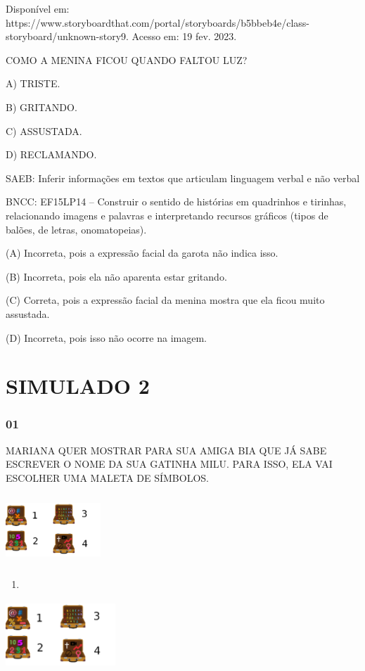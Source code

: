 Disponível em:
https://www.storyboardthat.com/portal/storyboards/b5bbeb4e/class-storyboard/unknown-story9. Acesso em: 19 fev. 2023.

COMO A MENINA FICOU QUANDO FALTOU LUZ?

A) TRISTE.

B) GRITANDO.

C) ASSUSTADA.

D) RECLAMANDO.

SAEB: Inferir informações em textos que articulam linguagem
verbal e não verbal

BNCC: EF15LP14 -- Construir o sentido de histórias em
quadrinhos e tirinhas, relacionando imagens e palavras e interpretando
recursos gráficos (tipos de balões, de letras, onomatopeias).

(A) Incorreta, pois a expressão facial da garota não indica isso.

(B) Incorreta, pois ela não aparenta estar gritando.

(C) Correta, pois a expressão facial da menina mostra que ela ficou
muito assustada.

(D) Incorreta, pois isso não ocorre na imagem.

\section{SIMULADO 2}\label{simulado-2}

\subsubsection{01}\label{section-41}

MARIANA QUER MOSTRAR PARA SUA AMIGA BIA QUE JÁ SABE ESCREVER O NOME DA
SUA GATINHA MILU. PARA ISSO, ELA VAI ESCOLHER UMA MALETA DE SÍMBOLOS.

\includegraphics[width=1.40208in,height=1.03194in]{media/image209.png}

\begin{enumerate}
\def\labelenumi{\arabic{enumi}.}
\item
\end{enumerate}

\includegraphics[width=1.62986in,height=0.98819in]{media/image209.png}

